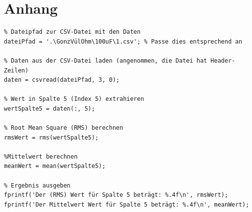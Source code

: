 \documentclass[12pt,a4paper,twoside]{article}
\begin{document}
\printbibliography[heading=bibintoc]

\section{Anhang}

\begin{verbatim}
% Dateipfad zur CSV-Datei mit den Daten
dateiPfad = '.\GonzVülOhm\100uF\1.csv'; % Passe dies entsprechend an

% Daten aus der CSV-Datei laden (angenommen, die Datei hat Header-Zeilen)
daten = csvread(dateiPfad, 3, 0);

% Wert in Spalte 5 (Index 5) extrahieren
wertSpalte5 = daten(:, 5);

% Root Mean Square (RMS) berechnen
rmsWert = rms(wertSpalte5);

%Mittelwert berechnen
meanWert = mean(wertSpalte5);

% Ergebnis ausgeben
fprintf('Der (RMS) Wert für Spalte 5 beträgt: %.4f\n', rmsWert);
fprintf('Der Mittelwert Wert für Spalte 5 beträgt: %.4f\n', meanWert);

\end{verbatim}
\end{document}
